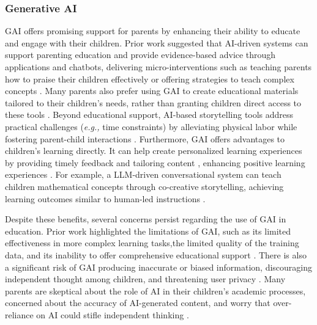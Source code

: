 \subsubsection{Generative AI}
GAI offers promising support for parents by enhancing their ability to educate and engage with their children. Prior work suggested that AI-driven systems can support parenting education \cite{petsolari2024socio} and provide evidence-based advice through applications and chatbots, delivering micro-interventions such as teaching parents how to praise their children effectively \cite{davis2017parent, entenberg2023user} or offering strategies to teach complex concepts \cite{mogavi2024chatgpt, su2023unlocking}. Many parents also prefer using GAI to create educational materials tailored to their children's needs, rather than granting children direct access to these tools \cite{han2023design}. Beyond educational support, AI-based storytelling tools address practical challenges (\textit{e.g.,} time constraints) by alleviating physical labor while fostering parent-child interactions \cite{sun2024exploring}. Furthermore, GAI offers advantages to children's learning directly. It can help create personalized learning experiences by providing timely feedback and tailoring content \cite{su2023unlocking, mogavi2024chatgpt, han2024teachers}, enhancing positive learning experiences \cite{jauhiainen2023generative}. For example, a LLM-driven conversational system can teach children mathematical concepts through co-creative storytelling, achieving learning outcomes similar to human-led instructions \cite{zhang2024mathemyths}.

Despite these benefits, several concerns persist regarding the use of GAI in education. Prior work highlighted the limitations of GAI, such as its limited effectiveness in more complex learning tasks,the limited quality of the training data, and its inability to offer comprehensive educational support \cite{su2023unlocking}. There is also a significant risk of GAI producing inaccurate or biased information, discouraging independent thought among children, and threatening user privacy \cite{su2023unlocking, han2023design, han2024teachers}. Many parents are skeptical about the role of AI in their children's academic processes, concerned about the accuracy of AI-generated content, and worry that over-reliance on AI could stifle independent thinking \cite{han2023design}.

